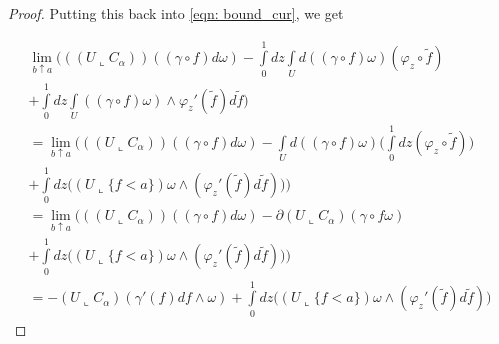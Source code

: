 \documentclass[10pt,a4paper]{amsart}
\begin{document}
\begin{proof}
    Putting this back into \ref{eqn: bound_cur}, we get
    
    \begin{gather*}
        \lim\limits_{b \uparrow a} \bigg( ((U \llcorner C_{\alpha}))((\gamma \circ f)d\omega) - \int\limits_{0}^{1} dz \int\limits_{U}d((\gamma \circ f)\omega)(\varphi_z \circ \tilde{f}) \\ + \int\limits_{0}^{1} dz \int\limits_{U} ((\gamma \circ f)\omega) \wedge \varphi_{z}'(\tilde{f})d\tilde{f}  
        \bigg) \\
        = \lim\limits_{b \uparrow a} \bigg( ((U \llcorner C_{\alpha}))((\gamma \circ f)d\omega) - \int\limits_{U} d((\gamma \circ f)\omega) \Big( \int\limits_{0}^{1} dz (\varphi_z \circ \tilde{f}) \Big) \\  + \int\limits_{0}^{1} dz \Big( (U \llcorner \{ f < a \}) \omega \wedge (\varphi_{z}'(\tilde{f})d\tilde{f}) \Big)
        \bigg) \\
        = \lim\limits_{b \uparrow a} \bigg( ((U \llcorner C_{\alpha}))((\gamma \circ f)d\omega) 
        - \partial (U \llcorner C_{\alpha}) (\gamma \circ f\omega) \\  
        + \int\limits_{0}^{1} dz \Big( (U \llcorner \{ f < a \}) \omega \wedge (\varphi_{z}'(\tilde{f})d\tilde{f}) \Big)
        \bigg) \\
        = - (U \llcorner C_{\alpha})(\gamma'(f)df \wedge \omega) + \int\limits_{0}^{1} dz \Big( (U \llcorner \{ f < a \}) \omega \wedge (\varphi_{z}'(\tilde{f})d\tilde{f}) \Big)
    \end{gather*}
    
\end{proof} 
\end{document}
